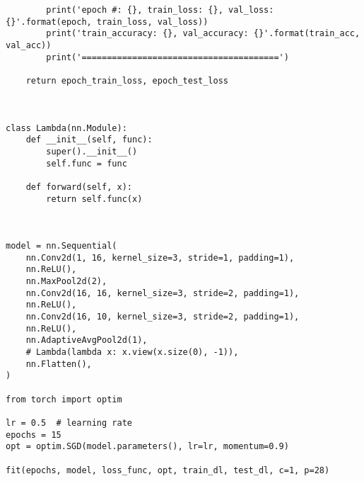 \documentclass[12pt]{article}%
\begin{document}
\begin{lstlisting}
        print('epoch #: {}, train_loss: {}, val_loss: {}'.format(epoch, train_loss, val_loss))
        print('train_accuracy: {}, val_accuracy: {}'.format(train_acc, val_acc))
        print('=======================================')

    return epoch_train_loss, epoch_test_loss



class Lambda(nn.Module):
    def __init__(self, func):
        super().__init__()
        self.func = func

    def forward(self, x):
        return self.func(x)



model = nn.Sequential(
    nn.Conv2d(1, 16, kernel_size=3, stride=1, padding=1),
    nn.ReLU(),
    nn.MaxPool2d(2),
    nn.Conv2d(16, 16, kernel_size=3, stride=2, padding=1),
    nn.ReLU(),
    nn.Conv2d(16, 10, kernel_size=3, stride=2, padding=1),
    nn.ReLU(),
    nn.AdaptiveAvgPool2d(1),
    # Lambda(lambda x: x.view(x.size(0), -1)),
    nn.Flatten(),
)

from torch import optim

lr = 0.5  # learning rate
epochs = 15
opt = optim.SGD(model.parameters(), lr=lr, momentum=0.9)

fit(epochs, model, loss_func, opt, train_dl, test_dl, c=1, p=28)
\end{lstlisting}
\end{document}
